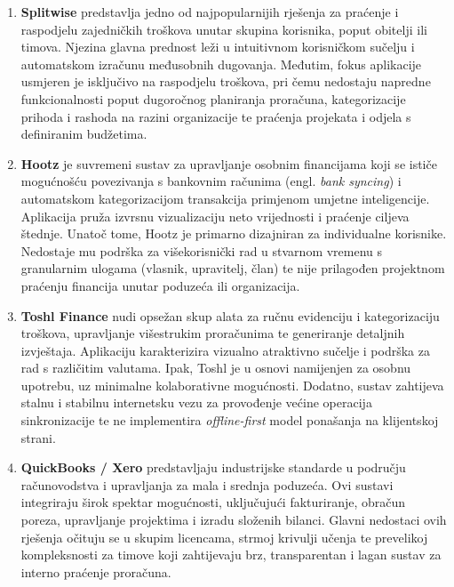 \documentclass[a4paper,12pt,oneside]{article}
\begin{document}
	\begin{enumerate}
		
		\item \textbf{Splitwise} \cite{w_splitwise} predstavlja jedno od najpopularnijih rješenja za praćenje i raspodjelu zajedničkih troškova unutar skupina korisnika, poput obitelji ili timova. Njezina glavna prednost leži u intuitivnom korisničkom sučelju i automatskom izračunu međusobnih dugovanja. Međutim, fokus aplikacije usmjeren je isključivo na raspodjelu troškova, pri čemu nedostaju napredne funkcionalnosti poput dugoročnog planiranja proračuna, kategorizacije prihoda i rashoda na razini organizacije te praćenja projekata i odjela s definiranim budžetima.
		
		\item \textbf{Hootz} je suvremeni sustav za upravljanje osobnim financijama koji se ističe mogućnošću povezivanja s bankovnim računima (engl. \textit{bank syncing}) i automatskom kategorizacijom transakcija primjenom umjetne inteligencije. Aplikacija pruža izvrsnu vizualizaciju neto vrijednosti i praćenje ciljeva štednje. Unatoč tome, Hootz je primarno dizajniran za individualne korisnike. Nedostaje mu podrška za višekorisnički rad u stvarnom vremenu s granularnim ulogama (vlasnik, upravitelj, član) te nije prilagođen projektnom praćenju financija unutar poduzeća ili organizacija.
		
		\item \textbf{Toshl Finance} \cite{w_toshl} nudi opsežan skup alata za ručnu evidenciju i kategorizaciju troškova, upravljanje višestrukim proračunima te generiranje detaljnih izvještaja. Aplikaciju karakterizira vizualno atraktivno sučelje i podrška za rad s različitim valutama. Ipak, Toshl je u osnovi namijenjen za osobnu upotrebu, uz minimalne kolaborativne mogućnosti. Dodatno, sustav zahtijeva stalnu i stabilnu internetsku vezu za provođenje većine operacija sinkronizacije te ne implementira \textit{offline-first} model ponašanja na klijentskoj strani.
		
		\item \textbf{QuickBooks / Xero} predstavljaju industrijske standarde u području računovodstva i upravljanja za mala i srednja poduzeća. Ovi sustavi integriraju širok spektar mogućnosti, uključujući fakturiranje, obračun poreza, upravljanje projektima i izradu složenih bilanci. Glavni nedostaci ovih rješenja očituju se u skupim licencama, strmoj krivulji učenja te prevelikoj kompleksnosti za timove koji zahtijevaju brz, transparentan i lagan sustav za interno praćenje proračuna.
		
	\end{enumerate}
	
\end{document}
